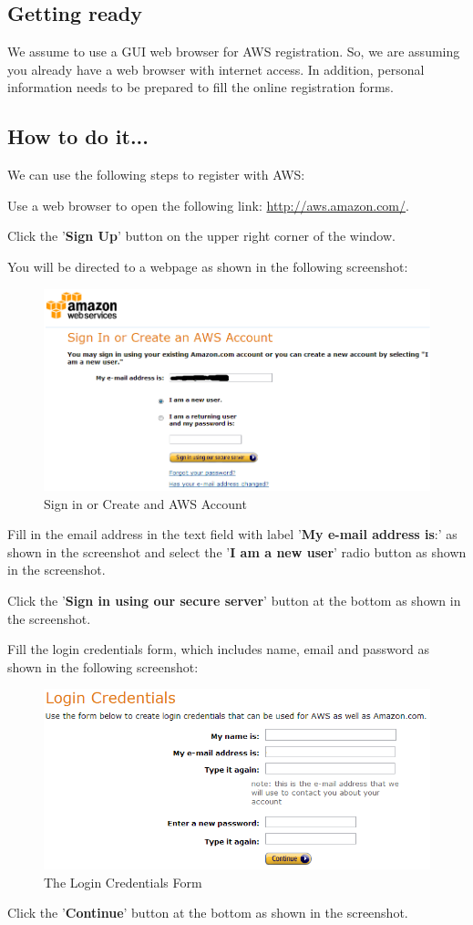 \subsection*{Getting ready}
We assume to use a GUI web browser for AWS registration. So, we are assuming you already have a web browser with internet access. In addition, personal information needs to be prepared to fill the online registration forms.
\subsection*{How to do it...}
We can use the following steps to register with AWS:

Use a web browser to open the following link: \url{http://aws.amazon.com/}.

Click the '\textbf{Sign Up}' button on the upper right corner of the window.

You will be directed to a webpage as shown in the following screenshot:
\begin{figure}[ht]
  \centering
  \includegraphics[width=.8\textwidth]{figs/5163os_08_01.png}
  \caption{Sign in or Create and AWS Account}\label{fig:aws.signin}
\end{figure} 
Fill in the email address in the text field with label '\textbf{My e-mail address is}:' as shown in the screenshot and select the '\textbf{I am a new user}' radio button as shown in the screenshot.

Click the '\textbf{Sign in using our secure server}' button at the bottom as shown in the screenshot.

Fill the login credentials form, which includes name, email and password as shown in the following screenshot:
\begin{figure}[ht]
  \centering
  \includegraphics[width=.8\textwidth]{figs/5163os_08_02.png}
  \caption{The Login Credentials Form}\label{fig:login.credentials}
\end{figure} 
Click the '\textbf{Continue}' button at the bottom as shown in the screenshot.


